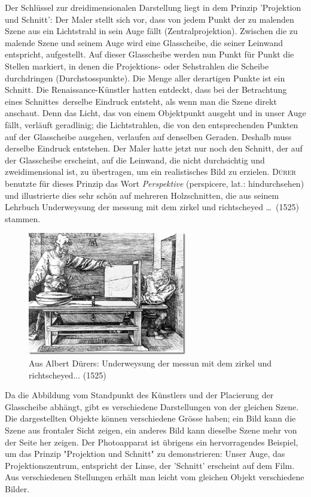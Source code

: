 \documentclass[%
11pt,%
twoside,%
titlepage,%
german,%
headsepline%
]{scrartcl}
\begin{document}
Der Schl\"ussel zur dreidimensionalen Darstellung liegt in dem Prinzip 'Projektion und Schnitt': Der Maler stellt sich vor, dass von jedem Punkt der zu malenden Szene aus ein Lichtstrahl in sein Auge f\"allt (Zentralprojektion). Zwischen die zu malende Szene und seinem Auge wird
eine Glasscheibe, die seiner Leinwand entspricht, aufgestellt. Auf dieser Glasscheibe werden nun Punkt f\"ur Punkt die Stellen markiert, in denen die Projektions- oder Sehstrahlen die Scheibe durchdringen (Durchstosspunkte). Die Menge aller derartigen Punkte ist ein \glqq Schnitt\grqq. Die Renaissance-K\"unstler hatten entdeckt, dass bei der Betrachtung eines \glqq Schnittes\grqq\ derselbe Eindruck entsteht, als wenn man die Szene direkt anschaut. Denn das Licht, das von einem Objektpunkt ausgeht und in unser Auge f\"allt, verl\"auft geradlinig; die Lichtstrahlen, die von den entsprechenden Punkten auf der Glasscheibe ausgehen, verlaufen auf denselben Geraden. Deshalb muss derselbe Eindruck entstehen. Der Maler hatte jetzt nur noch den \glqq Schnitt\grqq, der auf der Glasscheibe erscheint, auf die Leinwand, die nicht durchsichtig und zweidimensional ist, zu \"ubertragen, um ein realistisches Bild zu erzielen. \textsc{D\"urer} benutzte f\"ur dieses Prinzip das Wort \emph{Perspektive} (perspicere, lat.: hindurchsehen) und illustrierte dies sehr sch\"on auf mehreren Holzschnitten, die aus seinem Lehrbuch \glqq Underweysung der messung mit dem zirkel und richtscheyed \dots\grqq\ (1525) stammen.

\begin{figure}[h!]
\begin{center}
\includegraphics[width=0.618\textwidth]{pictures/durer}
\caption{Aus Albert D\"urers: Underweysung der messun mit dem zirkel und richtscheyed... (1525)}
\end{center}
\end{figure}

Da die Abbildung vom Standpunkt des K\"unstlers und der Placierung der Glasscheibe abh\"angt, gibt es verschiedene Darstellungen von der gleichen Szene. Die dargestellten Objekte k\"onnen verschiedene Gr\"osse haben; ein Bild kann die Szene aus frontaler Sicht zeigen, ein anderes Bild kann dieselbe Szene mehr von der Seite her zeigen. Der Photoapparat ist \"ubrigens ein hervorragendes Beispiel, um das Prinzip "Projektion und Schnitt" zu demonstrieren: Unser Auge, das Projektionszentrum, entspricht der Linse, der 'Schnitt' erscheint auf dem Film. Aus verschiedenen Stellungen erh\"alt man leicht vom gleichen Objekt verschiedene Bilder.
\end{document}
